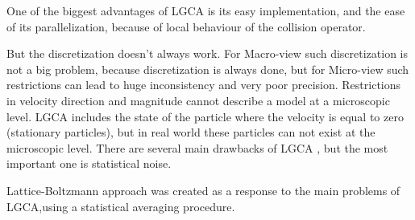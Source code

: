 One of the biggest advantages of LGCA is its easy implementation, and the ease
of its parallelization, because of local behaviour of the collision operator.

But the discretization doesn’t always work. For Macro-view such discretization is not a big problem, because discretization is always done, but for Micro-view such restrictions can lead to huge inconsistency and very poor precision. Restrictions in velocity direction and magnitude cannot describe a model at a microscopic level. LGCA includes the state of the particle where the velocity is equal to zero (stationary particles), but in real world these particles can not exist at the microscopic level. There are several main drawbacks of LGCA \cite{wolfgladrow}, but the most important one is statistical noise.

Lattice-Boltzmann approach was created as a response to the main problems of LGCA,using a statistical averaging procedure.
